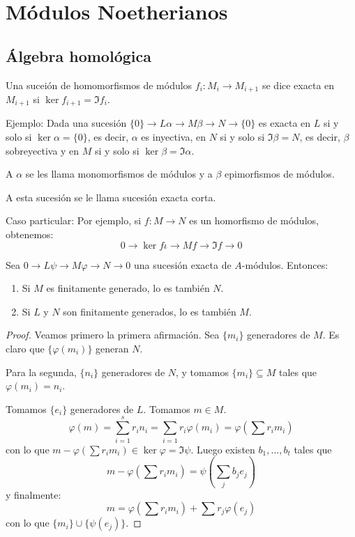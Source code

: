 \section{Módulos Noetherianos}
\subsection{Álgebra homológica}

\begin{df}
  Una suceión de homomorfismos de módulos \(f_i:M_i\longrightarrow
  M_{i+1}\) se dice exacta en
  \(M_{i+1}\) si \(\ker f_{i+1}=\Im f_i\).
\end{df}

Ejemplo: Dada una sucesión \(\{0\}\longrightarrow L \alpha
\longrightarrow M \beta\longrightarrow N\longrightarrow \{0\}\)
es exacta en \(L\) si y solo si \(\ker \alpha=\{0\}\), es decir,
\(\alpha\) es inyectiva, en \(N\) si y solo si \(\Im \beta = N\),
es decir, \(\beta\) sobreyectiva y en \(M\) si y solo si
\(\ker\beta=\Im\alpha\).

A \(\alpha\) se les llama monomorfismos de módulos y a
\(\beta\) epimorfismos de módulos.

A esta sucesión se le llama sucesión exacta corta.

Caso particular: Por ejemplo, si \(f:M\longrightarrow N\) es
un homorfismo de módulos, obtenemos:
\[
  0\longrightarrow\ker f\iota\longrightarrow M f\longrightarrow\Im f
  \longrightarrow 0
\]

\begin{prop}
  Sea \(0\longrightarrow L\psi\longrightarrow M\varphi\longrightarrow
  N\longrightarrow 0\) una sucesión exacta de \(A\)-módulos. Entonces:
  \begin{enumerate}
    \item Si \(M\) es finitamente generado, lo es también \(N\).
    \item Si \(L\) y \(N\) son finitamente generados, lo es también \(M\).
  \end{enumerate}
\end{prop}

\begin{proof}
  Veamos primero la primera afirmación. Sea \(\{m_i\}\) generadores de \(M\).
  Es claro que \(\{\varphi(m_i)\}\) generan \(N\).

  Para la segunda, \(\{n_i\}\) generadores de \(N\), y tomamos
  \(\{m_i\}\subseteq M\) tales que \(\varphi(m_i)= n_i\).

  Tomamos \(\{e_i\}\) generadores de \(L\). Tomamos \(m\in M\).
  \[
    \varphi(m)=\sum_{i=1}^s r_i n_i = \sum_{i=1} r_i\varphi(m_i)
    =\varphi(\sum r_i m_i)
  \]
  con lo que \(m-\varphi(\sum r_i m_i)\in\ker\varphi=\Im\psi\).
  Luego existen \(b_1,\ldots, b_t\) tales que
  \[
    m-\varphi(\sum r_i m_i)=\psi(\sum_j b_j e_j)
  \]
  y finalmente:
  \[
    m=\varphi(\sum r_i m_i)+\sum r_j \varphi(e_j)
  \]
  con lo que \(\{m_i\}\cup\{\psi(e_j)\}\).
\end{proof}

